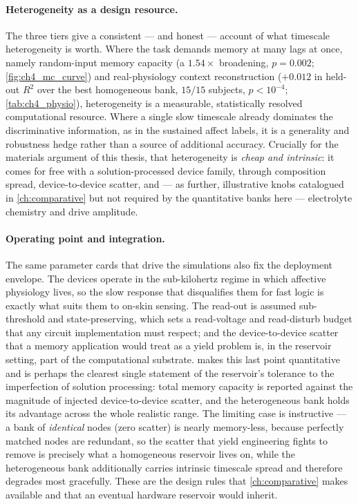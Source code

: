 \documentclass[12pt, twoside]{report}
\begin{document}
\paragraph{Heterogeneity as a design resource.} The three tiers give a consistent --- and honest --- account of what timescale heterogeneity is worth. Where the task demands memory at many lags at once, namely random-input memory capacity (a $1.54\times$ broadening, $p=0.002$; \cref{fig:ch4_mc_curve}) and real-physiology context reconstruction ($+0.012$ in held-out $R^2$ over the best homogeneous bank, $15/15$ subjects, $p<10^{-4}$; \cref{tab:ch4_physio}), heterogeneity is a measurable, statistically resolved computational resource. Where a single slow timescale already dominates the discriminative information, as in the sustained \WESAD{} affect labels, it is a generality and robustness hedge rather than a source of additional accuracy. Crucially for the materials argument of this thesis, that heterogeneity is \emph{cheap and intrinsic}: it comes for free with a solution-processed device family, through composition spread, device-to-device scatter, and --- as further, illustrative knobs catalogued in \cref{ch:comparative} but not required by the quantitative banks here --- electrolyte chemistry and drive amplitude.

\paragraph{Operating point and integration.} The same parameter cards that drive the simulations also fix the deployment envelope. The devices operate in the sub-kilohertz regime in which affective physiology lives, so the slow response that disqualifies them for fast logic is exactly what suits them to on-skin sensing. The read-out is assumed sub-threshold and state-preserving, which sets a read-voltage and read-disturb budget that any circuit implementation must respect; and the device-to-device scatter that a memory application would treat as a yield problem is, in the reservoir setting, part of the computational substrate.  makes this last point quantitative and is perhaps the clearest single statement of the reservoir's tolerance to the imperfection of solution processing: total memory capacity is reported against the magnitude of injected device-to-device scatter, and the heterogeneous bank holds its advantage across the whole realistic range. The limiting case is instructive --- a bank of \emph{identical} nodes (zero scatter) is nearly memory-less, because perfectly matched nodes are redundant, so the scatter that yield engineering fights to remove is precisely what a homogeneous reservoir lives on, while the heterogeneous bank additionally carries intrinsic timescale spread and therefore degrades most gracefully. These are the design rules that \cref{ch:comparative} makes available and that an eventual hardware reservoir would inherit.
\end{document}
